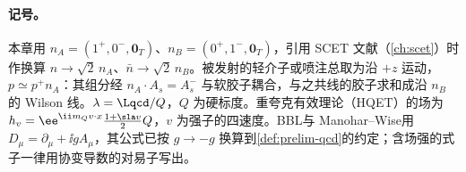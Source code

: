 \paragraph{记号。}
本章用 $n_A=(1^+,0^-,\mathbf 0_T)$、$n_B=(0^+,1^-,\mathbf 0_T)$，引用 SCET 文献（\cref{ch:scet}）时作换算 $n\to\sqrt2\,n_A$、$\bar n\to\sqrt2\,n_B$。被发射的轻介子或喷注总取为沿 $+z$ 运动，$p\simeq p^+n_A$：其组分经 $n_A\cdot A_s=A_s^-$ 与软胶子耦合，与之共线的胶子求和成沿 $n_B$ 的 Wilson 线。$\lambda=\Lqcd/Q$，$Q$ 为硬标度。重夸克有效理论（HQET）的场为 $h_v=\ee^{\ii m_Qv\cdot x}\frac{1+\sla v}{2}Q$，$v$ 为强子的四速度。BBL\cite{BodwinBraatenLepage1995}与 Manohar--Wise\cite{ManoharWise1994}用 $D_\mu=\partial_\mu+\ii gA_\mu$，其公式已按 $g\to-g$ 换算到\cref{def:prelim-qcd}的约定；含场强的式子一律用协变导数的对易子写出。

